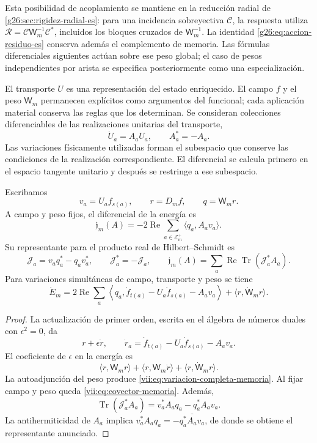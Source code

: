 Esta posibilidad de acoplamiento se mantiene en la reducción radial de
\ref{g26:sec:rigidez-radial-es}: para una incidencia sobreyectiva
\(\mathcal C\), la respuesta utiliza
\(\mathcal R=\mathcal C\mathsf W_m^{-1}\mathcal C^*\), incluidos
los bloques cruzados de \(\mathsf W_m^{-1}\). La identidad
\eqref{g26:eq:accion-residuo-es} conserva además el complemento de
memoria. Las fórmulas diferenciales siguientes actúan sobre ese peso
global; el caso de pesos independientes por arista se especifica
posteriormente como una especialización.

El transporte \(U\) es una representación del estado enriquecido. El campo
\(f\) y el peso \(\mathsf W_m\) permanecen explícitos como argumentos
del funcional; cada aplicación material conserva las reglas que los
determinan. Se consideran colecciones diferenciables de las realizaciones
unitarias del transporte,
\[
 \dot U_a=A_aU_a,\qquad A_a^*=-A_a.
\]
Las variaciones físicamente utilizadas forman el subespacio que conserve
las condiciones de la realización correspondiente. El diferencial se
calcula primero en el espacio tangente unitario y después se restringe
a ese subespacio.

\begin{proposition}
\label{vii:prop:covector-memoria}
Escribamos
\[
 v_a=U_af_{s(a)},\qquad r=D_mf,\qquad q=\mathsf W_mr.
\]
A campo y peso fijos, el diferencial de la energía es
\begin{equation}
 \mathfrak j_m(A)=-2\operatorname{Re}
       \sum_{a\in\mathcal E_m^+}\langle q_a,A_av_a\rangle .
 \label{vii:eq:covector-memoria}
\end{equation}
Su representante para el producto real de Hilbert--Schmidt es
\begin{equation}
 \mathcal J_a=v_aq_a^*-q_av_a^*,\qquad
 \mathcal J_a^*=-\mathcal J_a,\qquad
 \mathfrak j_m(A)=
 \sum_a\operatorname{Re}\operatorname{Tr}(\mathcal J_a^*A_a).
 \label{vii:eq:representante-corriente-discreta}
\end{equation}
Para variaciones simultáneas de campo, transporte y peso se tiene
\begin{equation}
 \dot E_m=
 2\operatorname{Re}\sum_a
 \left\langle q_a,\dot f_{t(a)}-U_a\dot f_{s(a)}-A_av_a\right\rangle
 +\langle r,\dot{\mathsf W}_mr\rangle .
 \label{vii:eq:variacion-completa-memoria}
\end{equation}
\end{proposition}

\begin{proof}
La actualización de primer orden, escrita en el álgebra de números
duales con \(\epsilon^2=0\), da
\[
 r+\epsilon\dot r,\qquad
 \dot r_a=\dot f_{t(a)}-U_a\dot f_{s(a)}-A_av_a.
\]
El coeficiente de \(\epsilon\) en la energía es
\[
 \langle\dot r,\mathsf W_mr\rangle+
 \langle r,\mathsf W_m\dot r\rangle+
 \langle r,\dot{\mathsf W}_mr\rangle.
\]
La autoadjunción del peso produce
\eqref{vii:eq:variacion-completa-memoria}. Al fijar campo y peso queda
\eqref{vii:eq:covector-memoria}. Además,
\[
 \operatorname{Tr}(\mathcal J_a^*A_a)
 =v_a^*A_aq_a-q_a^*A_av_a.
\]
La antihermiticidad de \(A_a\) implica
\(v_a^*A_aq_a=-\overline{q_a^*A_av_a}\), de donde se obtiene
el representante anunciado.
\end{proof}

